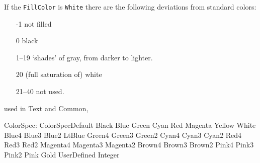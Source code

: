 \documentclass[10pt, a4paper]{article}%
\begin{document}
If the \texttt{FillColor} is \texttt{White} there are the following deviations 
from standard colors: 
%
\begin{enumerate}
\item[-1]    not filled
\item[0]     black
\item[1--19]  `shades' of gray, from darker to lighter.
\item[20]    (full saturation of) white
\item[21--40] not used. 
\end{enumerate}



used in Text and Common, 

ColorSpec:
ColorSpecDefault	 
Black	 
Blue	 
Green	 
Cyan	 
Red	 
Magenta	 
Yellow	 
White	 
Blue4	 
Blue3	 
Blue2	 
LtBlue	 
Green4	 
Green3	 
Green2	 
Cyan4	 
Cyan3	 
Cyan2	 
Red4	 
Red3	 
Red2	 
Magenta4	 
Magenta3	 
Magenta2	 
Brown4	 
Brown3	 
Brown2	 
Pink4	 
Pink3	 
Pink2	 
Pink	 
Gold	 
UserDefined Integer	 


{}%
\end{document}
